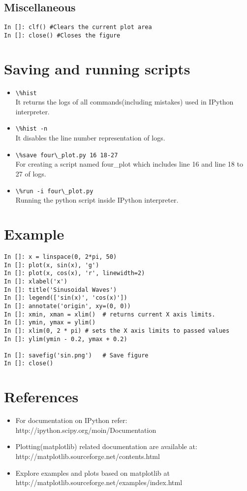 \documentclass[12pt]{article}
\newcommand{\typ}[1]{\lstinline{#1}}
\begin{document}
\subsection{Miscellaneous}
\typ{In []: clf() #Clears the current plot area}\\
\typ{In []: close() #Closes the figure}
\section{Saving and running scripts}
\begin{itemize}
  \item \typ{\%hist}\\
  It returns the logs of all commands(including mistakes) used in IPython interpreter.
  \item \typ{\%hist -n}\\
It disables the line number representation of logs.
  \item \typ{\%save four\_plot.py 16 18-27}\\
For creating a script named four\_plot which includes line 16 and line 18 to 27 of logs.
  \item \typ{\%run -i four\_plot.py}\\
Running the python script inside IPython interpreter.
\end{itemize}

\section{Example}
  \begin{lstlisting}
In []: x = linspace(0, 2*pi, 50)
In []: plot(x, sin(x), 'g')
In []: plot(x, cos(x), 'r', linewidth=2)
In []: xlabel('x')
In []: title('Sinusoidal Waves')
In []: legend(['sin(x)', 'cos(x)'])
In []: annotate('origin', xy=(0, 0))
In []: xmin, xman = xlim()  # returns current X axis limits.
In []: ymin, ymax = ylim()
In []: xlim(0, 2 * pi) # sets the X axis limits to passed values
In []: ylim(ymin - 0.2, ymax + 0.2) 

In []: savefig('sin.png')   # Save figure
In []: close()              
  \end{lstlisting}

\section{References}
\begin{itemize}
  \item For documentation on IPython refer: \\ http://ipython.scipy.org/moin/Documentation
  \item Plotting(matplotlib) related documentation are available at:\\ http://matplotlib.sourceforge.net/contents.html
  \item Explore examples and plots based on matplotlib at \\ http://matplotlib.sourceforge.net/examples/index.html
\end{itemize}
\end{document}
